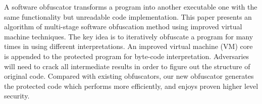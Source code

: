 A software obfuscator transforms a program into another executable one with the same functionality but unreadable code implementation. This paper presents an algorithm of multi-stage software obfuscation method using improved virtual machine techniques. The key idea is to iteratively obfuscate a program for many times in using different interpretations. An improved virtual machine (VM) core is appended to the protected program for byte-code interpretation. Adversaries will need to crack all intermediate results in order to figure out the structure of original code. Compared with existing obfuscators, our new obfuscator generates the protected code which performs more efficiently, and enjoys proven higher level security. 